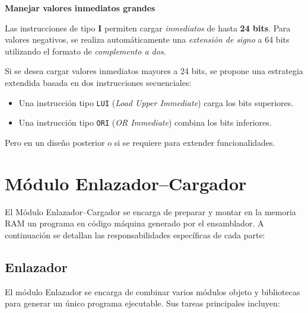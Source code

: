 \documentclass{article}
\begin{document}
\textbf{Manejar valores inmediatos grandes}

Las instrucciones de tipo \textbf{I} permiten cargar \textit{inmediatos} de hasta \textbf{24 bits}.  
Para valores negativos, se realiza automáticamente una \textit{extensión de signo} 
a 64 bits utilizando el formato de \textit{complemento a dos}.

Si se desea cargar valores inmediatos mayores a 24 bits, se propone una 
estrategia extendida basada en dos instrucciones secuenciales:

\begin{itemize}
    \item Una instrucción tipo \texttt{LUI} (\textit{Load Upper Immediate}) carga los bits superiores.
    \item Una instrucción tipo \texttt{ORI} (\textit{OR Immediate}) combina los bits inferiores.
\end{itemize}

Pero en un diseño posterior o si se requiere para extender funcionalidades.




\section{Módulo Enlazador–Cargador}

El Módulo Enlazador–Cargador se encarga de preparar y montar en la memoria RAM un programa en código máquina generado por el ensamblador. A continuación se detallan las responsabilidades específicas de cada parte:
\subsection{Enlazador}

El módulo Enlazador se encarga de combinar varios módulos objeto y bibliotecas para generar un único programa ejecutable. Sus tareas principales incluyen:
\end{document}
